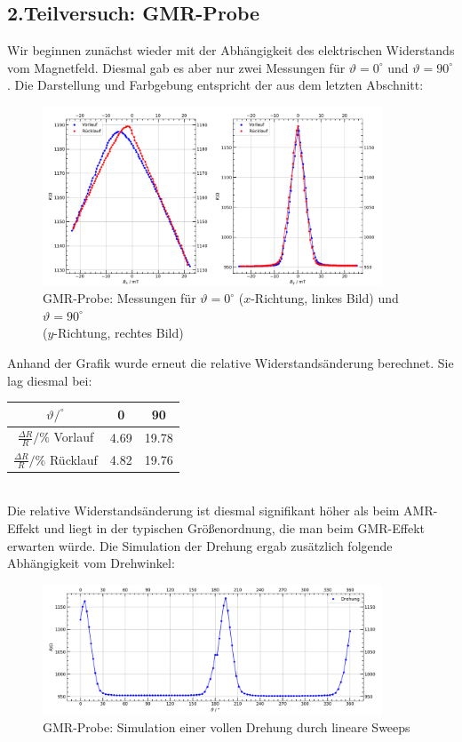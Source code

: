 \documentclass[german,  %
parskip=full,  %
]{scrartcl}
\begin{document}
\subsection{2.Teilversuch: GMR-Probe}
Wir beginnen zunächst wieder mit der Abhängigkeit des elektrischen Widerstands vom Magnetfeld. Diesmal gab es aber nur zwei Messungen für \(\vartheta = 0^{\circ}\) und \(\vartheta = 90^{\circ}\). Die Darstellung und Farbgebung entspricht der aus dem letzten Abschnitt: 
\newpage 
\begin{figure}[h!]\centering
\includegraphics[width=0.9\textwidth]{Probe2_0_und_90_Grad.png}
\caption{GMR-Probe: Messungen für \(\vartheta=0^{\circ}\) (\(x\)-Richtung, linkes Bild) und \(\vartheta=90^{\circ}\) \\ (\(y\)-Richtung, rechtes Bild)}
\end{figure} 
Anhand der Grafik wurde erneut die relative Widerstandsänderung berechnet. Sie lag diesmal bei:
\begin{table}[h!]\centering
\begin{tabular}{|c|c|c|}
\hline
\(\vartheta / ^{\circ}\) & 0 & 90 \\\hline
\(\frac{\Delta R}{R} / \% \) Vorlauf & 4.69 & 19.78 \\\hline
\(\frac{\Delta R}{R} / \% \) Rücklauf & 4.82 & 19.76 \\\hline
\end{tabular}
\end{table} \\
Die relative Widerstandsänderung ist diesmal signifikant höher als beim AMR-Effekt und liegt in der typischen Größenordnung, die man beim GMR-Effekt erwarten würde. Die Simulation der Drehung ergab zusätzlich folgende Abhängigkeit vom Drehwinkel: \\
\begin{figure}[h!]\centering
\includegraphics[width = 0.9\textwidth]{Probe2_Drehung.png}
\caption{GMR-Probe: Simulation einer vollen Drehung durch lineare Sweeps}
\end{figure} \\
\end{document}
